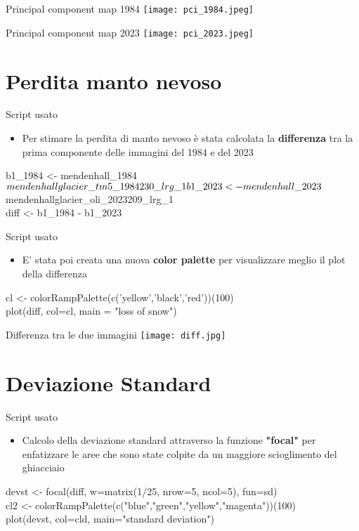 \documentclass{beamer}
\begin{document}
\begin{frame}{Principal component map 1984}
    \texttt{[image: pci\_1984.jpeg]}
    \centering
\end{frame}

\begin{frame}{Principal component map 2023}
    \texttt{[image: pci\_2023.jpeg]}
    \centering
\end{frame}

\section{Perdita manto nevoso}

\begin{frame}{Script usato}
\begin{itemize}
    \item Per stimare la perdita di manto nevoso è stata calcolata la \textbf{differenza} tra la prima componente delle immagini del 1984 e del 2023
\end{itemize}
\bigskip
\small b1\_1984 <- mendenhall\_1984$mendenhallglacier\_tm5\_1984230\_lrg\_1\\b1\_2023 <- mendenhall\_2023$mendenhallglacier\_oli\_2023209\_lrg\_1\\
\bigskip
diff <- b1\_1984 - b1\_2023
\end{frame}

\begin{frame}{Script usato}
\begin{itemize}
    \item E' stata poi creata una nuova \textbf{color palette} per visualizzare meglio il plot della differenza
\end{itemize}
\bigskip
\small cl <- colorRampPalette(c('yellow','black','red'))(100)\\
\bigskip
plot(diff, col=cl, main = "loss of snow")
\end{frame}

\begin{frame}{Differenza tra le due immagini}
    \texttt{[image: diff.jpg]}
    \centering
\end{frame}

\section{Deviazione Standard}

\begin{frame}{Script usato}
\begin{itemize}
    \item Calcolo della deviazione standard attraverso la funzione \textbf{"focal"} per enfatizzare le aree che sono state colpite da un maggiore scioglimento del ghiacciaio
\end{itemize}
\bigskip
\small devst <- focal(diff, w=matrix(1/25, nrow=5, ncol=5), fun=sd)\\
\bigskip
cl2 <- colorRampPalette(c("blue","green","yellow","magenta"))(100)\\
plot(devst, col=cld, main="standard deviation")
\end{frame}
\end{document}
